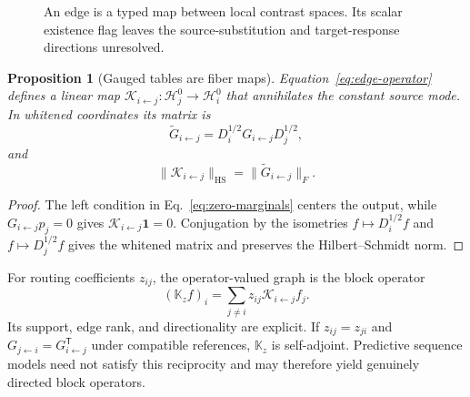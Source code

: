\documentclass[10pt]{article}
\newtheorem{proposition}[theorem]{Proposition}
\theoremstyle{definition}
\theoremstyle{remark}
\begin{document}
\ifdefined\BOOKMODE
\begin{figure}[htbp]
\centering
{}
\caption{An edge is a typed map between local contrast spaces.  Its scalar existence flag leaves
the source-substitution and target-response directions unresolved.}
\label{fig:fiber-edge-map}
\end{figure}
\fi

\begin{proposition}[Gauged tables are fiber maps]
\label{prop:fiber-map}
Equation~\ref{eq:edge-operator} defines a linear map
$\mathcal K_{i\leftarrow j}:\mathcal H_j^0\to\mathcal H_i^0$ that annihilates the constant source
mode.  In whitened coordinates its matrix is
\begin{equation}
\widetilde G_{i\leftarrow j}
=D_i^{1/2}G_{i\leftarrow j}D_j^{1/2},
\end{equation}
and
\begin{equation}
\|\mathcal K_{i\leftarrow j}\|_{\mathrm{HS}}
=\|\widetilde G_{i\leftarrow j}\|_F.
\label{eq:hs-norm}
\end{equation}
\end{proposition}

\begin{proof}
The left condition in Eq.~\ref{eq:zero-marginals} centers the output, while
$G_{i\leftarrow j}p_j=0$ gives $\mathcal K_{i\leftarrow j}\mathbf1=0$.  Conjugation by the
isometries $f\mapsto D_i^{1/2}f$ and $f\mapsto D_j^{1/2}f$ gives the whitened matrix and preserves
the Hilbert--Schmidt norm.
\end{proof}

For routing coefficients $z_{ij}$, the operator-valued graph is the block operator
\begin{equation}
(\mathbb K_zf)_i
=\sum_{j\ne i}z_{ij}\mathcal K_{i\leftarrow j}f_j.
\label{eq:block-operator}
\end{equation}
Its support, edge rank, and directionality are explicit.  If
$z_{ij}=z_{ji}$ and $G_{j\leftarrow i}=G_{i\leftarrow j}^{\mathsf T}$ under compatible
references, $\mathbb K_z$ is self-adjoint.  Predictive sequence models need not satisfy this
reciprocity and may therefore yield genuinely directed block operators.
\end{document}
